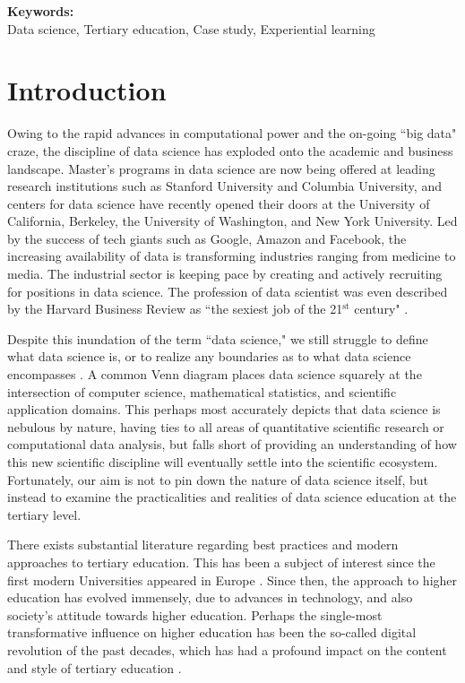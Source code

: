 \documentclass[12pt]{article}
\begin{document}
\vspace{0.4in}

\textbf{Keywords:} \\
\indent \indent Data science, Tertiary education, Case study, Experiential learning

\thispagestyle{empty}
\newpage

\section{Introduction}

Owing to the rapid advances in computational power and the on-going ``big data" craze, the discipline of data science has exploded onto the academic and business landscape. Master's programs in data science are now being offered at leading research institutions such as Stanford University and Columbia University, and centers for data science have recently opened their doors at the University of California, Berkeley, the University of Washington, and New York University. Led  by the success of tech giants such as Google, Amazon and Facebook, the increasing availability of data is transforming industries ranging from medicine to media.  The industrial sector is keeping pace by creating and actively recruiting for positions in data science.  The profession of data scientist was even described by the Harvard Business Review as ``the sexiest job of the 21$^{\text{st}}$ century" \citep{Patil2012}.

Despite this inundation of the term ``data science," we still struggle to define what data science is, or to realize any boundaries as to what data science encompasses \citep{Hayashi1998, Loukides2011, Provost2013}. A common Venn diagram places data science squarely at the intersection of computer science, mathematical statistics, and scientific application domains.  This perhaps most accurately depicts that data science is nebulous by nature, having ties to all areas of quantitative scientific research or computational data analysis, but falls short of providing an understanding of how this new scientific discipline will eventually settle into the scientific ecosystem.  Fortunately, our aim is not to pin down the nature of data science itself, but instead to examine the practicalities and realities of data science education at the tertiary level.

There exists substantial literature regarding best practices and modern approaches to tertiary education. This has been a subject of interest since the first modern Universities appeared in Europe \citep{Rudy1984, Pedersen1997}.  Since then, the approach to higher education has evolved immensely, due to advances in technology, and also society's attitude towards higher education.  Perhaps the single-most transformative influence on higher education has been the so-called digital revolution of the past decades, which has had a profound impact on the content and style of tertiary education \citep{Roberts1994, Ely1995, Baker1997, Wood2005, Baek2008}.
\end{document}
